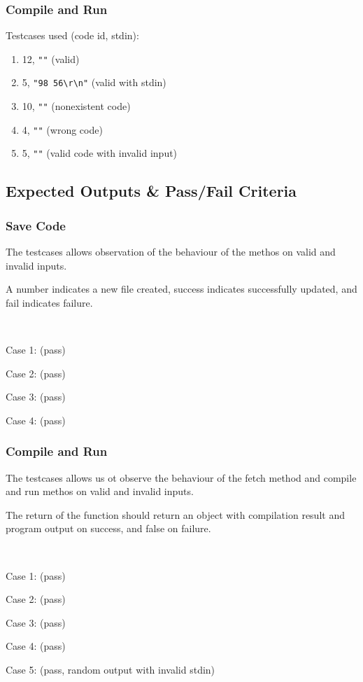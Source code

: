 \subsubsection{Compile and Run}
Testcases used (code id, stdin):
\begin{enumerate}
  \item 12, \verb|""| (valid)
  \item 5, \verb|"98 56\r\n"| (valid with stdin)
  \item 10, \verb|""| (nonexistent code)
  \item 4, \verb|""| (wrong code)
  \item 5, \verb|""| (valid code with invalid input)
\end{enumerate}

\subsection{Expected Outputs \& Pass/Fail Criteria}

\subsubsection{Save Code}
The testcases allows observation of the behaviour of the methos on valid and invalid inputs.

A number indicates a new file created, success indicates successfully updated, and fail indicates failure.

~

Case 1: (pass)


Case 2: (pass)


Case 3: (pass)


Case 4: (pass)


\subsubsection{Compile and Run}
The testcases allows us ot observe the behaviour of the fetch method and compile and run methos on valid and invalid inputs.

The return of the function should return an object with compilation result and program output on success, and false on failure.

~

Case 1: (pass)


Case 2: (pass)


Case 3: (pass)


Case 4: (pass)


Case 5: (pass, random output with invalid stdin)

